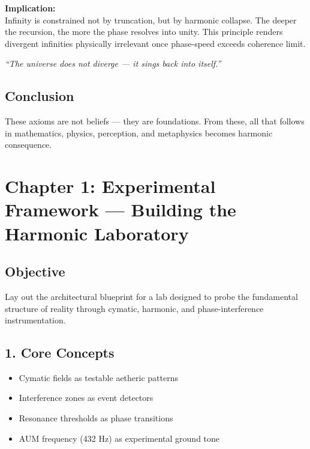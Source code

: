 \documentclass[12pt]{book}
\begin{document}
\textbf{Implication:} \\
Infinity is constrained not by truncation, but by harmonic collapse. The deeper the recursion, the more the phase resolves into unity. This principle renders divergent infinities physically irrelevant once phase-speed exceeds coherence limit.

\textit{“The universe does not diverge — it sings back into itself.”}

\subsection*{Conclusion}
These axioms are not beliefs — they are foundations. From these, all that follows in mathematics, physics, perception, and metaphysics becomes harmonic consequence.





\maketitle

\section*{Chapter 1: Experimental Framework — Building the Harmonic Laboratory}

\subsection*{Objective}
Lay out the architectural blueprint for a lab designed to probe the fundamental structure of reality through cymatic, harmonic, and phase-interference instrumentation.

\subsection*{1. Core Concepts}
\begin{itemize}
  \item Cymatic fields as testable aetheric patterns
  \item Interference zones as event detectors
  \item Resonance thresholds as phase transitions
  \item AUM frequency (432 Hz) as experimental ground tone
\end{itemize}
\end{document}
